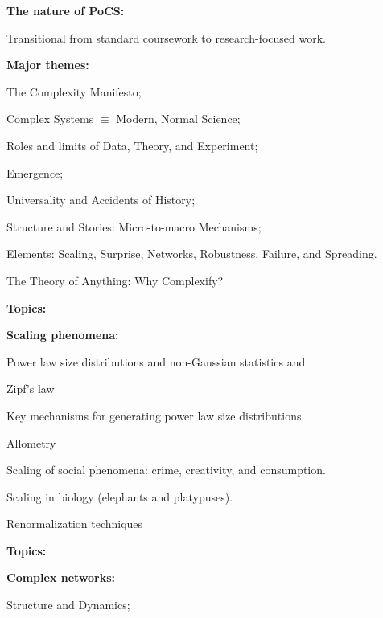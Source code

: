  \textbf{The nature of PoCS:}
    
    
      Transitional from standard coursework to research-focused work.
      {}
    
  

  \textbf{Major themes:}
    
     
      The Complexity Manifesto;
     
      Complex Systems $\equiv$ Modern, Normal Science;
    
      Roles and limits of Data, Theory, and Experiment;
    
      Emergence;
    
      Universality and Accidents of History;
     
      Structure and Stories: Micro-to-macro Mechanisms;
    
      Elements: 
      Scaling, Surprise, Networks, 
      Robustness, Failure,
      and
      Spreading.
     
      The Theory of Anything: Why Complexify?
    
  





  \textbf{Topics:}
  
  \textbf{Scaling phenomena:}
    
     
      Power law size distributions and non-Gaussian statistics and 
     
      Zipf's law
     
      Key mechanisms for generating power law size distributions
     
      Allometry
     
      Scaling of social phenomena: crime, creativity, and consumption.
     
      Scaling in biology (elephants and platypuses).
     
      Renormalization techniques
    
  




  \textbf{Topics:}

  \textbf{Complex networks:}
    
     
      Structure and Dynamics;
     
